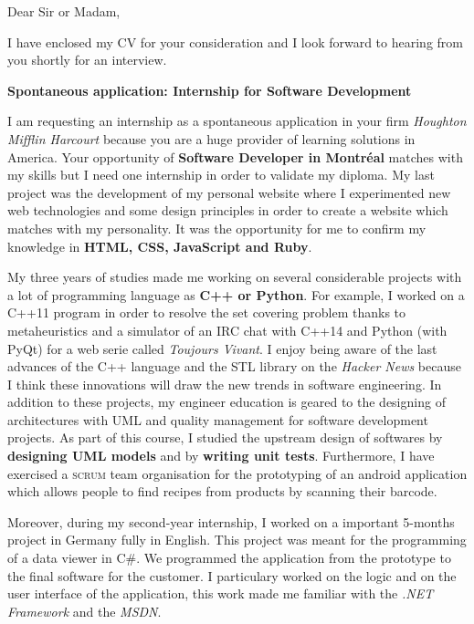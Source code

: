 \date{\today}
\opening{Dear Sir or Madam,}
\closing{I have enclosed my CV for your consideration and I look forward to hearing from you shortly for an interview.}

\makelettertitle

\textbf{Spontaneous application: Internship for Software Development}

\introduce{}
I am requesting an internship as a spontaneous application in your firm \textit{Houghton Mifflin Harcourt} because you are a huge provider of learning solutions in America. Your opportunity of \textbf{Software Developer in Montréal} matches with my skills but I need one internship in order to validate my diploma. My last project was the development of my personal website where I experimented new web technologies and some design principles in order to create a website which matches with my personality. It was the opportunity for me to confirm my knowledge in \textbf{HTML, CSS, JavaScript and Ruby}.

My three years of studies made me working on several considerable projects with a lot of programming language as \textbf{C++ or Python}. For example, I worked on a C++11 program in order to resolve the set covering problem thanks to metaheuristics and a simulator of an IRC chat with C++14 and Python (with PyQt) for a web serie called \textit{Toujours Vivant}. I enjoy being aware of the last advances of the C++ language and the STL library on the \textit{Hacker News} because I think these innovations will draw the new trends in software engineering. In addition to these projects, my engineer education is geared to the designing of architectures with UML and quality management for software development projects. As part of this course, I studied the upstream design of softwares by \textbf{designing UML models} and by \textbf{writing unit tests}. Furthermore, I have exercised a \textsc{scrum} team organisation for the prototyping of an android application which allows people to find recipes from products by scanning their barcode.

Moreover, during my second-year internship, I worked on a important 5-months project in Germany fully in English. This project was meant for the programming of a data viewer in C\#. We programmed the application from the prototype to the final software for the customer. I particulary worked on the logic and on the user interface of the application, this work made me familiar with the \textit{.NET Framework} and the \textit{MSDN}. \conclude{}

\makeletterclosing
